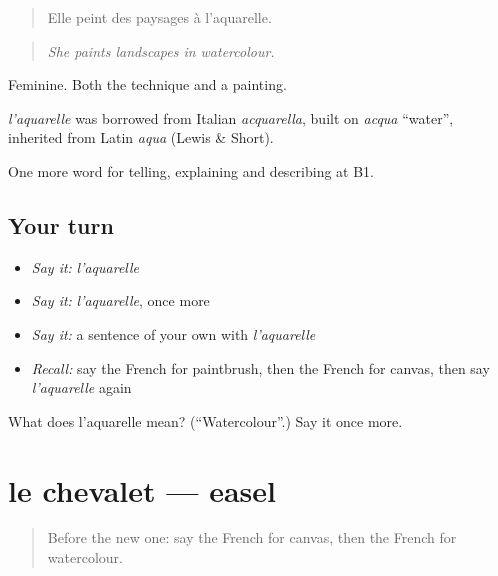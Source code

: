 \begin{quote}
Elle peint des paysages à l'aquarelle.
\end{quote}

\begin{quote}
\emph{She paints landscapes in watercolour.}
\end{quote}

Feminine. Both the technique and a painting.

\begin{cousinweb}
\emph{l'aquarelle} was borrowed from Italian \emph{acquarella}, built on \emph{acqua} \textquotedblleft{}water\textquotedblright{}, inherited from Latin \emph{aqua} (Lewis \& Short).
\end{cousinweb}

\begin{grammarlens}[title={What you've built}]
One more word for telling, explaining and describing at B1.
\end{grammarlens}

\subsection*{Your turn}
\begin{itemize}
\raggedright
  \item \emph{Say it:} \emph{l'aquarelle}
  \item \emph{Say it:} \emph{l'aquarelle}, once more
  \item \emph{Say it:} a sentence of your own with \emph{l'aquarelle}
  \item \emph{Recall:} say the French for paintbrush, then the French for canvas, then say \emph{l'aquarelle} again
\end{itemize}

\begin{tcolorbox}[breakable,colback=teal!4,colframe=teal!35!black,title={Before you move on}]
What does l'aquarelle mean? (\textquotedblleft{}Watercolour\textquotedblright{}.) Say it once more.
\end{tcolorbox}
\section[le chevalet]{le chevalet — easel}

\label{lesson:FR-C516-chevalet}



\begin{quote}
Before the new one: say the French for canvas, then the French for watercolour.
\end{quote}

